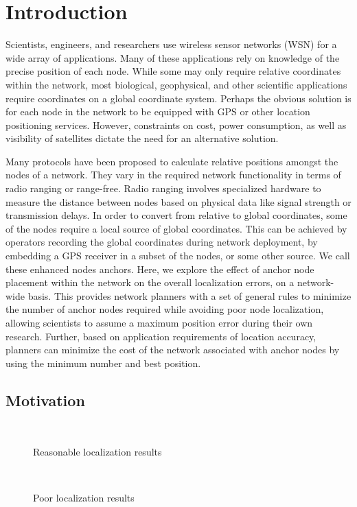 
\chapter{Introduction}

Scientists, engineers, and researchers use wireless sensor networks (WSN) for a wide array of applications. Many of these applications rely on knowledge of the precise position of each node. While some may only require relative coordinates within the network, most biological, geophysical, and other scientific applications require coordinates on a global coordinate system. Perhaps the obvious solution is for each node in the network to be equipped with GPS or other location positioning services.  However, constraints on cost, power consumption, as well as visibility of satellites dictate the need for an alternative solution.  

Many protocols have been proposed\cite{APS,MDS-MAP,CCA-MAP07} to calculate relative positions amongst the nodes of a network.  They vary in the required network functionality in terms of radio ranging or range-free.  Radio ranging involves specialized hardware to measure the distance between nodes based on physical data like signal strength or transmission delays.  In order to convert from relative to global coordinates, some of the nodes require a local source of global coordinates.  This can be achieved by operators recording the global coordinates during network deployment, by embedding a GPS receiver in a subset of the nodes, or some other source.  We call these enhanced nodes anchors.  Here, we explore the effect of anchor node placement within the network on the overall localization errors, on a network-wide basis. This provides network planners with a set of general rules to minimize the number of anchor nodes required while avoiding poor node localization, allowing scientists to assume a maximum position error during their own research.  Further, based on application requirements of location accuracy, planners can minimize the cost of the network associated with anchor nodes by using the minimum number and best position.

\section{Motivation} 
\begin{figure}
  \centering
    \\
	\caption{Reasonable localization results}
    \label{fig:Motivation1}    
\end{figure}
\begin{figure}
  \centering
	\\
    \caption{Poor localization results}
    \label{fig:Motivation2}
\end{figure}

